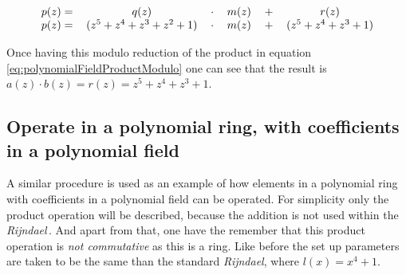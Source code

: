 \documentclass[10pt,a4paper,twoside]{llncs}
\newcommand{\todo}[1]{\texttt{\color{red}TODO:} ``\emph{#1}''}
\newcommand{\fixme}[1]{\texttt{\color{red}FIXME:} ``\emph{#1}''}
\newcommand{\rijndael}{\emph{Rijndael}}
\begin{document}
\begin{equation}\label{eq:polynomialFieldProductModulo}
 \begin{tabular}{cccccc}
  $p(z)=$&$q(z)$               &$\cdot$&$m(z)$&$+$&$r(z)$\\
  $p(z)=$&$(z^5+z^4+z^3+z^2+1)$&$\cdot$&$m(z)$&$+$&$(z^5+z^4+z^3+1)$\\
 \end{tabular}
\end{equation}

% 

Once having this modulo reduction of the product in equation \ref{eq:polynomialFieldProductModulo} one can see that the result is $a(z)\cdot b(z)=r(z)=z^5+z^4+z^3+1$.

\subsection{Operate in a polynomial ring, with coefficients in a polynomial field}\label{sec:polynomialRing}

A similar procedure is used as an example of how elements in a polynomial ring with coefficients in a polynomial field can be operated. For simplicity only the product operation will be described, because the addition is not used within the \rijndael\,. And apart from that, one have the remember that this product operation is \emph{not commutative} as this is a ring. Like before the set up parameters are taken to be the same than the standard \rijndael, where $l(x)=x^4+1$.
\end{document}

